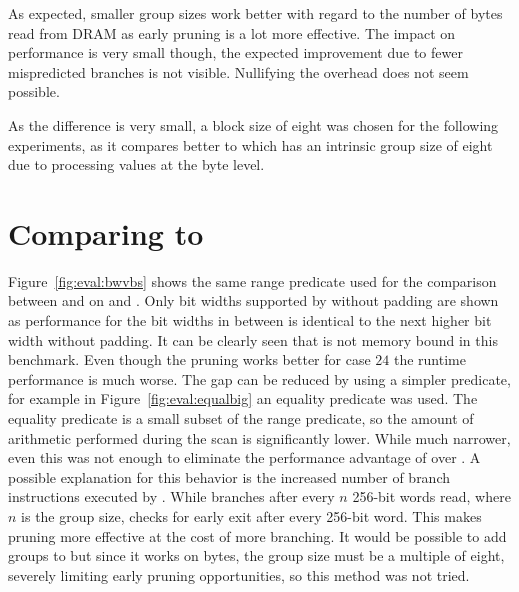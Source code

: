 As expected, smaller group sizes work better with regard to the number of bytes
read from DRAM as early pruning is a lot more effective. The impact on
performance is very small though, the expected improvement due to fewer
mispredicted branches is not visible. Nullifying the overhead does not seem
possible.

As the difference is very small, a block size of eight was chosen for the
following experiments, as it compares better to \bs{} which has an intrinsic
group size of eight due to processing values at the byte level.

\section{Comparing \bwv{} to \bs{}}

Figure~\ref{fig:eval:bwvbs} shows the same range predicate used for the
comparison between \simdscan{} and \bwv{} on \bs{} and \bwv{}. Only bit widths
supported by \bs{} without padding are shown as \bs{} performance for the bit
widths in between is identical to the next higher bit width without padding. It
can be clearly seen that \bs{} is not memory bound in this benchmark. Even
though the pruning works better for case $24$ the runtime performance is much
worse. The gap can be reduced by using a simpler predicate, for example in
Figure~\ref{fig:eval:equalbig} an equality predicate was used.  The equality
predicate is a small subset of the range predicate, so the amount of arithmetic
performed during the scan is significantly lower.  While much narrower, even this
was not enough to eliminate the performance advantage of \bwv{} over \bs{}. A
possible explanation for this behavior is the increased number of branch
instructions executed by \bs{}. While \bwv{} branches after every $n$ 256-bit
words read, where $n$ is the group size, \bs{} checks for early exit after every
256-bit word. This makes pruning more effective at the cost of more branching.
It would be possible to add groups to \bs{} but since it works on bytes, the
group size must be a multiple of eight, severely limiting early pruning
opportunities, so this method was not tried.

